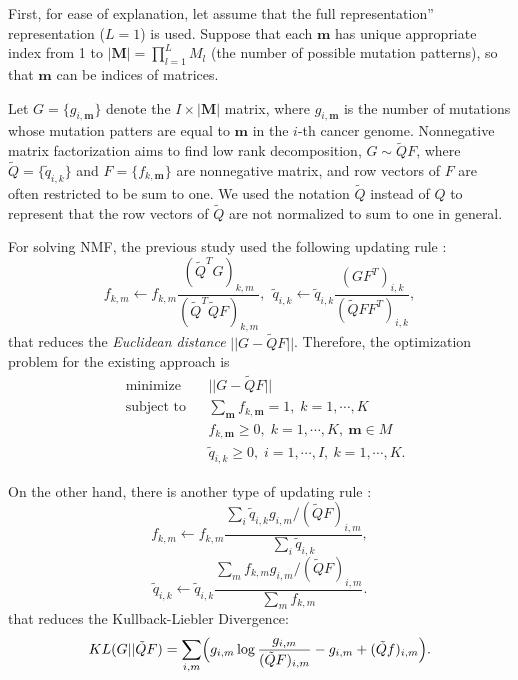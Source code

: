 \documentclass{article}
\begin{document}
First, for ease of explanation, let assume that the full representation'' representation ($L = 1$) is used.
Suppose that each $\bm{m}$ has unique appropriate index from 1 to  $| \bm{M} | = \prod_{l=1}^L M_l$ (the number of possible mutation patterns),
so that $\bm{m}$ can be indices of matrices.

Let $G = \{ g_{i, \bm{m}} \}$ denote the $I \times | \bm{M} | $ matrix, 
where $g_{i, \bm{m}}$ is the number of mutations whose mutation patters are equal to $\bm{m}$ in the $i$-th cancer genome.
Nonnegative matrix factorization aims to find low rank decomposition, 
$G \sim \tilde{Q} F$,
where $\tilde{Q} = \{ \tilde{q}_{i,k} \}$ and $F = \{ f_{k, \bm{m}} \}$ are nonnegative matrix, 
and row vectors of $F$ are often restricted to be sum to one. 
We used the notation $\tilde{Q}$ instead of $Q$
to represent that the row vectors of $\tilde{Q}$ are not normalized to sum to one in general.

For solving NMF, 
the previous study \cite{pmid23318258} used the following updating rule \cite{Lee00algorithmsfor}:
\begin{equation*}
f_{k,m} \gets f_{k,m} \frac{ ( \tilde{Q}^T G)_{k,m} }{ ( \tilde{Q}^T \tilde{Q} F  )_{k,m} },\  \
\tilde{q}_{i,k} \gets \tilde{q}_{i,k}  \frac{ (G F^T)_{i,k} }{ ( \tilde{Q} F F^T )_{i,k} },
\end{equation*}
that reduces the {\it Euclidean distance} $|| G - \tilde{Q} F ||$. 
Therefore, the optimization problem for the existing approach is
\begin{equation}
\begin{aligned}
& \text{minimize}
& & ||G - \tilde{Q} F || \\
& \text{subject to}
& & \sum_{ \bm{m} } f_{k, \bm{m}} =  1, \; k = 1, \cdots, K \\ &
& & f_{k, \bm{m}} \geq 0, \; k = 1, \cdots, K,\ \bm{m} \in M \\ & 
& & \tilde{q}_{i, k} \geq 0, \; i = 1, \cdots, I,\ k = 1, \cdots, K.
\end{aligned}
\end{equation}

On the other hand, there is another type of updating rule \cite{Lee00algorithmsfor}:
\begin{equation*}
f_{k,m} \gets f_{k,m} \frac{ \sum_i \tilde{q}_{i,k} g_{i,m} / ( \tilde{Q} F)_{i,m} }{ \sum_i \tilde{q}_{i,k} },
\end{equation*}
\begin{equation*}
\tilde{q}_{i,k} \gets \tilde{q}_{i,k}  \frac{ \sum_m f_{k,m} g_{i,m} / ( \tilde{Q} F)_{i,m} }{ \sum_m f_{k,m} }.
\end{equation*}
that reduces the Kullback-Liebler Divergence:
\begin{equation*}
KL(G ||  \tilde{Q} F) = \sum_{i,m} \Bigl( g_{i,m} \log  \frac{ g_{i,m} }{ (\tilde{Q} F)_{i,m} } - g_{i,m} + ( \tilde{Q} f )_{i,m} \Bigr).
\end{equation*}
\end{document}
